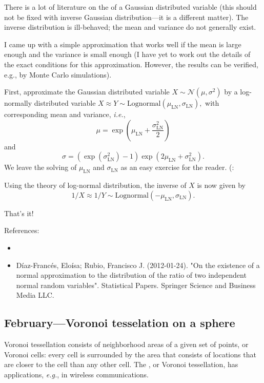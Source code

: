\documentclass{article}
\begin{document}
There is a lot of literature on the  of a Gaussian distributed variable (this should not be fixed with inverse Gaussian distribution---it is a different matter). The inverse distribution is ill-behaved; the mean and variance do not generally exist.

I came up with a simple approximation that works well if the mean is large enough and the variance is small enough (I have yet to work out the details of the exact conditions for this approximation. However, the results can be verified, e.g., by Monte Carlo simulations).

First, approximate the Gaussian distributed variable $X \sim \mathcal{N}(\mu, \sigma^2)$ by a log-normally distributed variable $X \approx Y \sim \text{Lognormal}(\mu_{\text{LN}}, \sigma_{\text{LN}}),$ with corresponding mean and variance, \textit{i.e.}, $$\mu = \exp\left( \mu_{\text{LN}} + \frac{\sigma_{\text{LN}}^2}{2} \right)$$ and
$$\sigma = (\exp( \sigma_{\text{LN}}^2) - 1)\exp(2 \mu_{\text{LN}} + \sigma_{\text{LN}}^2).$$ We leave the solving of $\mu_{\text{LN}}$ and $\sigma_{\text{LN}}$ as an easy exercise for the reader. (:


Using the theory of log-normal distribution, the inverse of $X$ is now given by
$$
1/X \approx 1/Y \sim \text{Lognormal}(-\mu_{\text{LN}}, \sigma_{\text{LN}}).
$$

That's it!



References:
\begin{itemize}
\item {}
\item  Díaz-Francés, Eloísa; Rubio, Francisco J. (2012-01-24). "On the existence of a normal approximation to the distribution of the ratio of two independent normal random variables". Statistical Papers. Springer Science and Business Media LLC.
\end{itemize}


\subsection{February---Voronoi tesselation on a sphere}

Voronoi tessellation consists of neighborhood areas of a given set of points, or Voronoi cells: every cell is surrounded by the area that consists of locations that are closer to the cell than any other cell. The , or Voronoi tessellation, has applications, \textit{e.g.}, in wireless communications. 
\end{document}

